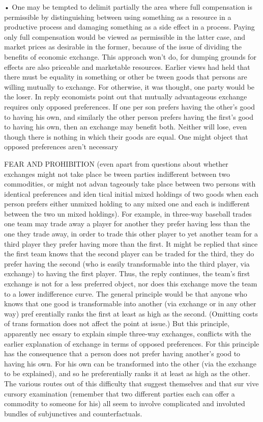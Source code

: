 \documentclass[11pt,openany]{book}
\begin{document}
{• One may be tempted to delimit partially the area where full compensation is permissible by distinguishing between using something as a resource in a productive process and damaging something as a side effect in a process. Paying only full compensation would be viewed as permissible in the latter case, and market prices as desirable in the former, because of the issue of dividing the benefits of economic exchange. This approach won't do, for dumping grounds for effects are also priceable and marketable resources. Earlier views had held that there must be equality in something or other be tween goods that persons are willing mutually to exchange. For otherwise, it was thought, one party would be the loser. In reply economists point out that mutually advantageous exchange requires only opposed preferences. If one per son prefers having the other's good to having his own, and similarly the other person prefers having the first's good to having his own, then an exchange may benefit both. Neither will lose, even though there is nothing in which their goods are equal. One might object that opposed preferences aren't necessary\par

FEAR AND PROHIBITION (even apart from questions about whether exchanges might not take place be tween parties indifferent between two commodities, or might not advan tageously take place between two persons with identical preferences and iden tical initial mixed holdings of two goods when each person prefers either unmixed holding to any mixed one and each is indifferent between the two un mixed holdings). For example, in three-way baseball trades one team may trade away a player for another they prefer having less than the one they trade away, in order to trade this other player to yet another team for a third player they prefer having more than the first. It might be replied that since the first team knows that the second player can be traded for the third, they do prefer having the second (who is easily transformable into the third player, via exchange) to having the first player. Thus, the reply continues, the team's first exchange is not for a less preferred object, nor does this exchange move the team to a lower indifference curve. The general principle would be that anyone who knows that one good is transformable into another (via exchange or in any other way) pref erentially ranks the first at least as high as the second. (Omitting costs of trans formation does not affect the point at issue.) But this principle, apparently nec essary to explain simple three-way exchanges, conflicts with the earlier explanation of exchange in terms of opposed preferences. For this principle has the consequence that a person does not prefer having another's good to having his own. For his own can be transformed into the other (via the exchange to be explained), and so he preferentially ranks it at least as high as the other. The various routes out of this difficulty that suggest themselves and that sur vive cursory examination (remember that two different parties each can offer a commodity to someone for his) all seem to involve complicated and involuted bundles of subjunctives and counterfactuals.\par

}
\end{document}
